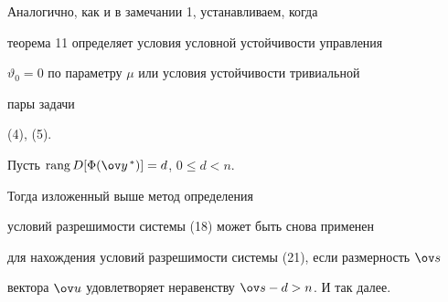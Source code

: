  


\begin{note} 


Аналогично, как и в замечании 1, устанавливаем, когда 


теорема 11 определяет условия условной устойчивости управления 


$\vartheta_0=0$ по параметру $\mu$ или условия устойчивости тривиальной 


пары задачи 


(4), (5). 


\end{note} 


 


Пусть $\rang D[\Phi(\ov y^{\,*})]=d$, $0\le d<n$. 


Тогда изложенный выше метод определения 


условий разрешимости системы (18) может быть снова применен 


для нахождения условий разрешимости системы (21), если размерность $\ov 


s$ 


вектора $\ov u$ удовлетворяет неравенству $\ov s-d>n$. И так далее. 


 


